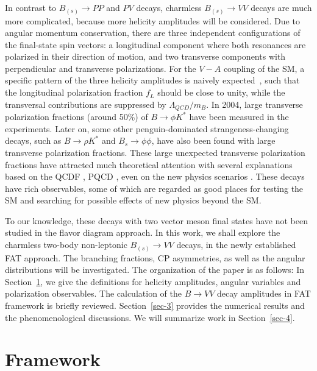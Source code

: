 \documentclass[11pt]{article}
\begin{document}
 In contrast to $B_{(s)} \to PP$ and $PV$ decays, charmless $B_{(s)} \to V V$ decays are much more complicated, because more helicity amplitudes will be considered. Due to angular momentum conservation, there are three independent configurations of the final-state spin vectors: a longitudinal component where   both resonances are polarized in their direction of motion, and two transverse components with perpendicular and transverse polarizations. For the $V-A$ coupling of the SM, a specific pattern of the three helicity amplitudes is naively expected~\cite{Koerner1979}, such that the longitudinal polarization fraction $f_L$ should be close to unity, while the transversal contributions are suppressed by $\Lambda_{QCD}/m_B$. In 2004,   large transverse polarization fractions (around 50\%) of  $B\to \phi K^*$  have been measured in the experiments. Later on, some other penguin-dominated strangeness-changing decays, such as $B\to \rho K^*$ and $B_s\to \phi \phi$, have also been found with large transverse polarization fractions. These large unexpected transverse polarization fractions have attracted much theoretical attention with several explanations based on the QCDF \cite{Li:2003he, Kagan:2004uw, Beneke:2006hg, Bartsch:2008ps, Cheng:2008gxa, Cheng:2009cn, Cheng:2009mu}, PQCD \cite{Li:2004ti, Ali:2007ff, Zou:2015iwa}, even on the new physics scenarios \cite{Hou:2004vj, Ladisa:2004bp, Yang:2004pm, Das:2004hq, Kim:2004wq, Zou:2005gw, Huang:2005if, Baek:2005jk, Huang:2005qb, Bao:2008hd}. These decays have     rich observables, some of which are regarded as good places for testing the SM and searching for possible effects of new physics beyond the SM.

To our knowledge, these decays with two vector meson final states have not been studied in the flavor diagram approach.
In this work, we shall  explore the charmless two-body non-leptonic $B_{(s)} \to V V$  decays, in the newly established  FAT  approach.   The branching fractions, CP asymmetries, as well as the angular distributions will be investigated. The organization of the paper is as follows: In Section~\ref{sec-2}, we   give the definitions for   helicity amplitudes, angular variables and polarization observables. The calculation of the $B\to VV$ decay amplitudes in FAT framework is briefly reviewed. Section~\ref{sec-3} provides the  numerical results and the phenomenological discussions. We will summarize work in Section~\ref{sec-4}.

\section{Framework}\label{sec-2}
\end{document}
